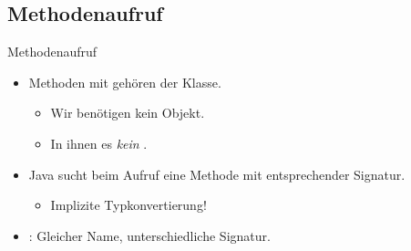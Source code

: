 {\subsection{Methodenaufruf}
\begin{frame}[c]{Methodenaufruf}
   \begin{itemize}[<+(1)->]
      \itemsep11pt
      \item Methoden mit  gehören der Klasse. \begin{itemize}
         \item Wir benötigen kein Objekt.
         \item In ihnen  es \textit{kein} .
      \end{itemize}
      \item Java sucht beim Aufruf eine Methode mit entsprechender Signatur. \begin{itemize}
         \item Implizite Typkonvertierung!
      \end{itemize}
      \item {}: Gleicher Name, unterschiedliche Signatur.
   \end{itemize}
\end{frame}

}
